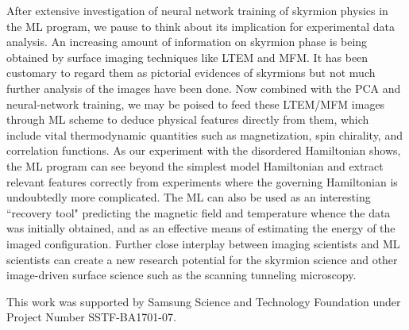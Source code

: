 \documentclass[reprint,amsmath,amssymb,aps,showpacs,superscriptaddress,prl]{revtex4-1}
\begin{document}
After extensive investigation of neural network training of skyrmion physics in the ML program, we pause to think about its implication for experimental data analysis. An increasing amount of information on skyrmion phase is being obtained by surface imaging techniques like LTEM and MFM. It has been customary to regard them as pictorial evidences of skyrmions but not much further analysis of the images have been done. Now combined with the PCA and neural-network training, we may be poised to feed these LTEM/MFM images through ML scheme to deduce physical features directly from them, which include vital thermodynamic quantities such as magnetization, spin chirality, and correlation functions. As our experiment with the disordered Hamiltonian shows, the ML program can see beyond the simplest model Hamiltonian and extract relevant features correctly from experiments where the governing Hamiltonian is undoubtedly more complicated. The ML can also be used as an interesting ``recovery tool" predicting the magnetic field and temperature whence the data was initially obtained, and as an effective means of estimating the energy of the imaged configuration. Further close interplay between imaging scientists and ML scientists can create a new research potential for the skyrmion science and other image-driven surface science such as the scanning tunneling microscopy.

This work was supported by Samsung Science and Technology Foundation under Project Number SSTF-BA1701-07.
\end{document}
